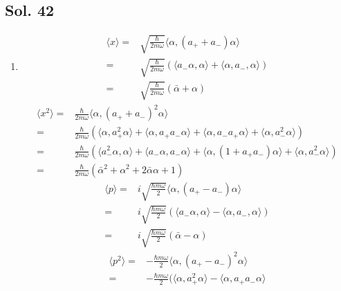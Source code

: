 \subsection*{Sol. 42}
\begin{enumerate}
    \item 
    \begin{align*}
        \langle x\rangle
        =&
        \sqrt{\frac{\hbar}{2m\omega}}
        \langle \alpha, (a_++a_-)\alpha\rangle\\
        =&\sqrt{\frac{\hbar}{2m\omega}}
        (\langle a_-\alpha,\alpha\rangle + \langle\alpha,a_-,\alpha\rangle)\\
        =&
        \sqrt{\frac{\hbar}{2m\omega}}
        (\bar{\alpha}+\alpha)
    \end{align*}
    \begin{align*}
        \langle x^2\rangle
        =&
        \frac{\hbar}{2m\omega}
        \langle \alpha, (a_++a_-)^2\alpha\rangle\\
        =&\frac{\hbar}{2m\omega}
        (\langle\alpha, a_+^2\alpha\rangle+
        \langle\alpha, a_+a_-\alpha\rangle
        +
        \langle\alpha, a_-a_+\alpha\rangle+
        \langle\alpha, a_-^2\alpha\rangle)\\
        =&\frac{\hbar}{2m\omega}
        (\langle a_-^2\alpha, \alpha\rangle+
        \langle a_-\alpha, a_-\alpha\rangle
        +
        \langle\alpha, (1+a_+a_-)\alpha\rangle+
        \langle\alpha, a_-^2\alpha\rangle)\\
        =&
        \frac{\hbar}{2m\omega}
        (\bar{\alpha}^2+\alpha^2+2\bar{\alpha}\alpha + 1
        )
    \end{align*}
    \begin{align*}
        \langle p\rangle
        =&
        i
        \sqrt{\frac{\hbar m\omega}{2}}
        \langle \alpha, (a_+-a_-)\alpha\rangle\\
        =&i
        \sqrt{\frac{\hbar m\omega}{2}}
        (\langle a_-\alpha,\alpha\rangle -\langle\alpha,a_-,\alpha\rangle)\\
        =&
        i
        \sqrt{\frac{\hbar m\omega}{2}}
        (\bar{\alpha}-\alpha)
    \end{align*}
    \begin{align*}
        \langle p^2\rangle
        =&
        -\frac{\hbar m\omega}{2}
        \langle \alpha, (a_+-a_-)^2\alpha\rangle\\
        =&-\frac{\hbar m\omega}{2}
        (\langle\alpha, a_+^2\alpha\rangle-
        \langle\alpha, a_+a_-\alpha\rangle

\end{align*}
\end{enumerate}
